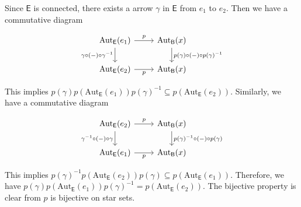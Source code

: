 \documentclass{report}
\begin{document}
\begin{prf}
	Since $\mathsf{E}$ is connected, there exists a arrow $\gamma$ in $\mathsf{E}$ from $e_1$ to $e_2$. Then we have a commutative diagram
	\begin{center}
		\[
			\begin{tikzcd}[ampersand replacement=\&]
				\mathrm{Aut}_\mathsf{E}(e_1) \arrow[r, "p"] \arrow[d, "\gamma\circ(-)\circ\gamma^{-1}"'] \& \mathrm{Aut}_\mathsf{B}(x) \arrow[d, "p(\gamma)\circ(-)\circ p(\gamma)^{-1}"] \\
				\mathrm{Aut}_\mathsf{E}(e_2) \arrow[r, "p"'] \& \mathrm{Aut}_\mathsf{B}(x)
			\end{tikzcd}
		\]
	\end{center}
	This implies $ p(\gamma)p(\mathrm{Aut}_\mathsf{E}(e_1))p(\gamma)^{-1}\subseteq p(\mathrm{Aut}_\mathsf{E}(e_2))$.
	Similarly, we have a commutative diagram
	\begin{center}
		\[
			\begin{tikzcd}[ampersand replacement=\&]
				\mathrm{Aut}_\mathsf{E}(e_2) \arrow[r, "p"] \arrow[d, "\gamma^{-1}\circ(-)\circ\gamma"'] \& \mathrm{Aut}_\mathsf{B}(x) \arrow[d, "p(\gamma)^{-1}\circ(-)\circ p(\gamma)"] \\
				\mathrm{Aut}_\mathsf{E}(e_1) \arrow[r, "p"'] \& \mathrm{Aut}_\mathsf{B}(x)
			\end{tikzcd}
		\]
	\end{center}
	This implies $ p(\gamma)^{-1}p(\mathrm{Aut}_\mathsf{E}(e_2))p(\gamma)\subseteq p(\mathrm{Aut}_\mathsf{E}(e_1))$. Therefore, we have  $ p(\gamma)p(\mathrm{Aut}_\mathsf{E}(e_1))p(\gamma)^{-1}= p(\mathrm{Aut}_\mathsf{E}(e_2))$. The bijective property is clear from $p$ is bijective on star sets.
\end{prf}
\end{document}
